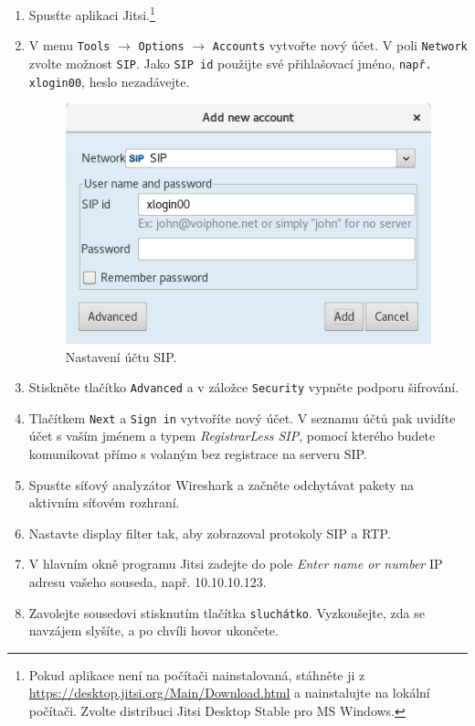 \documentclass[a4paper,11pt]{article}
\begin{document}
\begin{enumerate}
    \item Spusťte aplikaci Jitsi.\footnote{Pokud aplikace není na počítači nainstalovaná, stáhněte ji z \url{https://desktop.jitsi.org/Main/Download.html} a nainstalujte na lokální počítači. Zvolte distribuci Jitsi Desktop Stable pro MS Windows.} 
    \item V menu {\tt Tools} $\rightarrow$ {\tt Options} $\rightarrow$ {\tt Accounts} vytvořte nový účet. V poli {\tt Network} zvolte možnost {\tt SIP}. Jako {\tt SIP id} použijte své přihlašovací jméno, {\tt např. xlogin00}, heslo nezadávejte.
    \begin{figure}[h]
    	\centering
    	\includegraphics[scale=0.40]{img/account_p2p.png}
    	\caption{Nastavení účtu SIP.}
    	\label{fig:sip_account}
    \end{figure}

    \item Stiskněte tlačítko {\tt Advanced} a v záložce {\tt Security} vypněte podporu šifrování.
    \item Tlačítkem {\tt Next} a {\tt Sign in} vytvoříte nový účet. V seznamu účtů pak uvidíte účet s vaším jménem a typem {\it RegistrarLess SIP}, pomocí kterého budete komunikovat přímo s volaným bez registrace na serveru SIP.
    \item Spusťte síťový analyzátor Wireshark a začněte odchytávat pakety na aktivním síťovém rozhraní.
    \item Nastavte display filter tak, aby zobrazoval protokoly SIP a RTP.
    \item V hlavním okně programu Jitsi zadejte do pole {\it Enter name or number} IP adresu vašeho souseda, např. 10.10.10.123.
    \item Zavolejte sousedovi stisknutím tlačítka {\tt sluchátko}. Vyzkoušejte, zda se navzájem slyšíte, a po chvíli hovor ukončete.
      

\end{enumerate}
\end{document}
